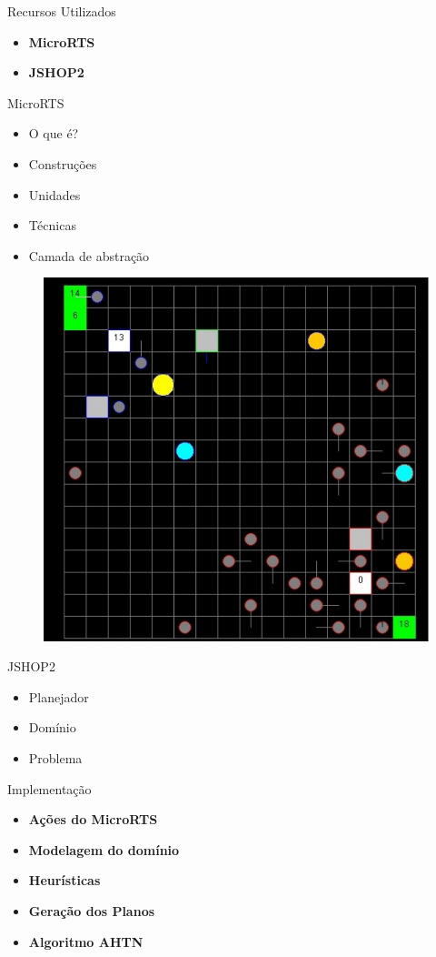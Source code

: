 \documentclass{beamer}
\begin{document}
{
	\begin{frame}{Recursos Utilizados}
		\vspace{5mm}
		\begin{itemize}
			\item \textbf{MicroRTS}
			\item \textbf{JSHOP2}
		\end{itemize}
	\end{frame}
}
\begin{frame}{MicroRTS}
	\begin{itemize}
		\item O que é?
		\item Construções
		\item Unidades
		\item Técnicas
		\item Camada de abstração
	\end{itemize}
	\vspace{-3mm}
	\begin{figure}[here]
		\includegraphics[width=0.4\linewidth]{fig/microRTS.pdf}	
	\end{figure}	
\end{frame}
\begin{frame}{JSHOP2}
	\begin{itemize}
		\item Planejador
		\item Domínio
		\item Problema
	\end{itemize}
\end{frame}

{
	\begin{frame}{Implementação}
		\vspace{5mm}
		\begin{itemize}
			\item \textbf{Ações do MicroRTS}
			\item \textbf{Modelagem do domínio}
			\item \textbf{Heurísticas}
			\item \textbf{Geração dos Planos}
			\item \textbf{Algoritmo AHTN}
		\end{itemize}
	\end{frame}
}
\end{document}
